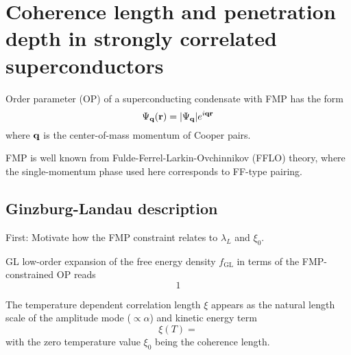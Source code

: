 \chapter{Coherence length and penetration depth in strongly correlated superconductors}\label{ch:coherence-length-and-penetration-depth-in-strongly-correlated-superconductors}


Order parameter (OP) of a superconducting condensate with FMP has the form
\begin{equation}
    \Psi_{\mathbf{q}} (\mathbf{r}) = \vert \Psi_{\mathbf{q}} \vert e^{i \mathbf{q} \mathbf{r}}
\end{equation}
where \(\mathbf{q}\) is the center-of-mass momentum of Cooper pairs.

FMP is well known from Fulde-Ferrel-Larkin-Ovchinnikov (FFLO) theory, where the single-momentum phase used here corresponds to FF-type pairing. 

\section{Ginzburg-Landau description}

First: Motivate how the FMP constraint relates to \(\lambda_L\) and \(\xi_0\).

GL low-order expansion of the free energy density \(f_{\mathrm{GL}}\) in terms of the FMP-constrained OP reads
\begin{equation}
    1
\end{equation}


The temperature dependent correlation length \(\xi\) appears as the natural length scale of the amplitude mode (\(\propto \alpha\)) and kinetic energy term
\begin{equation}
    \xi (T) =
\end{equation}
with the zero temperature value \(\xi_0\) being the coherence length.




